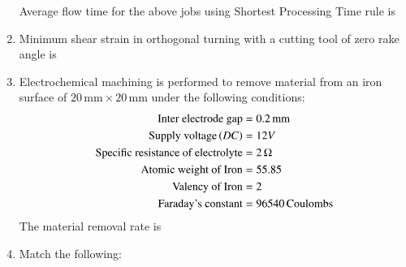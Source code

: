 \documentclass[journal]{IEEEtran}
\begin{document}
\begin{enumerate}[start=37]
\begin{table}[h]
\begin{tabular}{|c|c|}
		\end{tabular}
	\end{table}
Average flow time  for the above jobs using Shortest Processing Time rule is 
\begin{enumerate}
\end{enumerate}
\item Minimum shear strain in orthogonal turning with a cutting tool of zero rake angle is  
\begin{enumerate}
\end{enumerate}
\item Electrochemical machining is performed to remove material from an iron surface of $20 \, \text{mm} \times 20 \, \text{mm}$ under the following conditions:
	\begin{align}
		\text{Inter electrode gap} &= 0.2 \, \text{mm} \\
		\text{Supply voltage} \left(DC\right) & =12V \\
		\text{Specific resistance of electrolyte} &= 2 \, \Omega \\
		\text{Atomic weight of Iron} &= 55.85 \\
		\text{Valency of Iron} &=2 \\
		\text{Faraday's constant} &= 96540 \,\text{Coulombs}
	\end{align}
		The material removal rate  is
\begin{enumerate}
\end{enumerate}
\item Match the following:

\end{enumerate}
\end{document}
